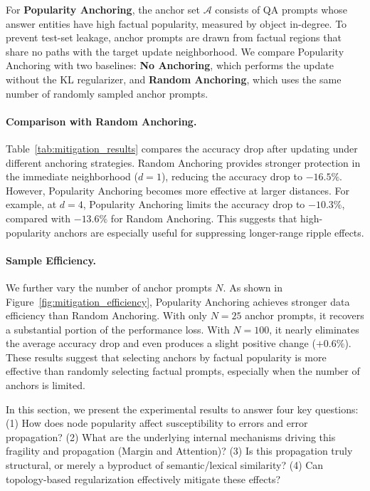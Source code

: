 For \textbf{Popularity Anchoring}, the anchor set $\mathcal{A}$ consists of QA prompts whose answer entities have high factual popularity, measured by object in-degree. To prevent test-set leakage, anchor prompts are drawn from factual regions that share no paths with the target update neighborhood. We compare Popularity Anchoring with two baselines: \textbf{No Anchoring}, which performs the update without the KL regularizer, and \textbf{Random Anchoring}, which uses the same number of randomly sampled anchor prompts.

\paragraph{Comparison with Random Anchoring.}
Table~\ref{tab:mitigation_results} compares the accuracy drop after updating under different anchoring strategies. Random Anchoring provides stronger protection in the immediate neighborhood ($d=1$), reducing the accuracy drop to $-16.5\%$. However, Popularity Anchoring becomes more effective at larger distances. For example, at $d=4$, Popularity Anchoring limits the accuracy drop to $-10.3\%$, compared with $-13.6\%$ for Random Anchoring. This suggests that high-popularity anchors are especially useful for suppressing longer-range ripple effects.

\paragraph{Sample Efficiency.}
We further vary the number of anchor prompts $N$. As shown in Figure~\ref{fig:mitigation_efficiency}, Popularity Anchoring achieves stronger data efficiency than Random Anchoring. With only $N=25$ anchor prompts, it recovers a substantial portion of the performance loss. With $N=100$, it nearly eliminates the average accuracy drop and even produces a slight positive change ($+0.6\%$). These results suggest that selecting anchors by factual popularity is more effective than randomly selecting factual prompts, especially when the number of anchors is limited.


In this section, we present the experimental results to answer four key questions: (1) How does node popularity affect susceptibility to errors and error propagation? (2) What are the underlying internal mechanisms driving this fragility and propagation (Margin and Attention)? (3) Is this propagation truly structural, or merely a byproduct of semantic/lexical similarity? (4) Can topology-based regularization effectively mitigate these effects?

